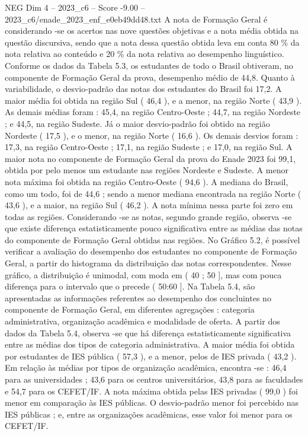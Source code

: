 \begin{textsample}{NEG Dim 4 – 2023\_c6 – Score -9.00 – 2023\_c6/enade\_2023\_enf\_e0eb49dd48.txt}
A nota de Formação Geral é considerando -se os acertos nas nove questões objetivas e a nota média obtida na questão discursiva, sendo que a nota dessa questão obtida leva em conta 80 \% da nota relativa ao conteúdo e 20 \% da nota relativa ao desempenho linguístico.
Conforme os dados da Tabela 5.3, os estudantes de todo o Brasil obtiveram, no componente de Formação Geral da prova, desempenho médio de 44,8.
Quanto à variabilidade, o desvio-padrão das notas dos estudantes do Brasil foi 17,2.
A maior média foi obtida na região Sul ( 46,4 ), e a menor, na região Norte ( 43,9 ).
As demais médias foram : 45,4, na região Centro-Oeste ; 44,7, na região Nordeste ; e 44,5, na região Sudeste.
Já o maior desvio-padrão foi obtido na região Nordeste ( 17,5 ), e o menor, na região Norte ( 16,6 ).
Os demais desvios foram : 17,3, na região Centro-Oeste ; 17,1, na região Sudeste ; e 17,0, na região Sul.
A maior nota no componente de Formação Geral da prova do Enade 2023 foi 99,1, obtida por pelo menos um estudante nas regiões Nordeste e Sudeste.
A menor nota máxima foi obtida na região Centro-Oeste ( 94,6 ).
A mediana do Brasil, como um todo, foi de 44,6 ; sendo a menor mediana encontrada na região Norte ( 43,6 ), e a maior, na região Sul ( 46,2 ).
A nota mínima nessa parte foi zero em todas as regiões.
Considerando -se as notas, segundo grande região, observa -se que existe diferença estatisticamente pouco significativa entre as médias das notas do componente de Formação Geral obtidas nas regiões.
No Gráfico 5.2, é possível verificar a avaliação do desempenho dos estudantes no componente de Formação Geral, a partir do histograma da distribuição das notas correspondentes.
Nesse gráfico, a distribuição é unimodal, com moda em ( 40 ; 50 ], mas com pouca diferença para o intervalo que o precede ( 50:60 ].
Na Tabela 5.4, são apresentadas as informações referentes ao desempenho dos concluintes no componente de Formação Geral, em diferentes agregações : categoria administrativa, organização acadêmica e modalidade de oferta.
A partir dos dados da Tabela 5.4, observa -se que há diferença estatisticamente significativa entre as médias dos tipos de categoria administrativa.
A maior média foi obtida por estudantes de IES pública ( 57,3 ), e a menor, pelos de IES privada ( 43,2 ).
Em relação às médias por tipos de organização acadêmica, encontra -se : 46,4 para as universidades ; 43,6 para os centros universitários, 43,8 para as faculdades e 54,7 para os CEFET/IF.
A nota máxima obtida pelas IES privadas ( 99,0 ) foi menor em comparação às IES públicas.
O desvio-padrão menor foi percebido nas IES públicas ; e, entre as organizações acadêmicas, esse valor foi menor para os CEFET/IF.

\end{textsample}
